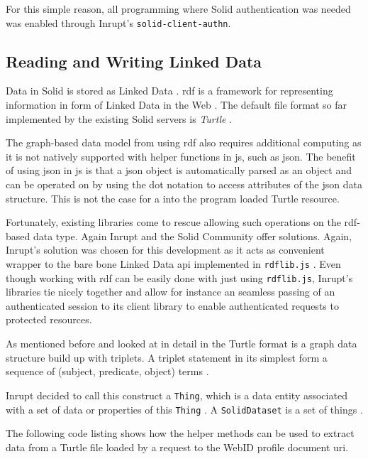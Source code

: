 For this simple reason, all programming where Solid authentication was needed was enabled through Inrupt's \texttt{solid-client-authn}.

\subsection{Reading and Writing Linked Data}

Data in Solid is stored as Linked Data \cite{Malhotra:15:LDP}. \gls{rdf} is a framework for representing information in form of Linked Data in the Web \cite{Cyganiak:14:RCA}. The default file format so far implemented by the existing Solid servers is \textit{Turtle} \cite{Prud:hommeaux:14:RT}.

The graph-based data model from using \gls{rdf} also requires additional computing as it is not natively supported with helper functions in \gls{js}, such as \gls{json}. The benefit of using \gls{json} in \gls{js} is that a \gls{json} object is automatically parsed as an object and can be operated on by using the dot notation to access attributes of the \gls{json} data structure. This is not the case for a into the program loaded Turtle resource.

Fortunately, existing libraries come to rescue allowing such operations on the \gls{rdf}-based data type. Again Inrupt and the Solid Community offer solutions. Again, Inrupt's solution was chosen for this development as it acts as convenient wrapper to the bare bone Linked Data \gls{api} implemented in \texttt{rdflib.js} \cite{rdflib-js}. Even though working with \gls{rdf} can be easily done with just using \texttt{rdflib.js}, Inrupt's libraries tie nicely together and allow for instance an seamless passing of an authenticated session to its client library to enable authenticated requests to protected resources.

As mentioned before and looked at in detail in \cite{cern-solid-investigation-spec} the Turtle format is a graph data structure build up with triplets. A triplet statement in its simplest form a sequence of (subject, predicate, object) terms \cite{Prud:hommeaux:14:RT}. 

Inrupt decided to call this construct a \texttt{Thing}, which is a data entity associated with a set of data or properties of this \texttt{Thing} \cite{thing}. A \texttt{SolidDataset} is a set of things \cite{inrupt-dataset}.

The following code listing shows how the helper methods can be used to extract data from a Turtle file loaded by a request to the WebID profile document \gls{uri}.

